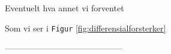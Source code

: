 Eventuelt hva annet vi forventet

Som vi ser i \texttt{Figur} \ref{fig:differensialforsterker}


------------------------------------------









